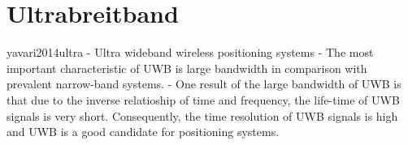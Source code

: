 \begin{comment}
Fragestellung:
- Welche elektrische Beschaltung ist notwendig um das DWM1000 Modul von DecaWave in Betrieb nehmen zu können?
- Wie erfolgt die Entfernungsmessung zwischen den einzelnen UWB--Modulen?
- Wie erfolgt der Datenaustausch zwischen einem UWB--Modul und der Verarbeitungseinheit?
\end{comment}

\chapter{Ultrabreitband}

\begin{comment}
- Was ist UWB überhaupt?
- Wie unterscheidet es sich von der bisherigen Verfahren?
- Auflisten einige Eigenschaften
\end{comment}


yavari2014ultra - Ultra wideband wireless positioning systems
	- The most important characteristic of UWB is large bandwidth in comparison with
prevalent narrow-band systems.
	- One result of the large bandwidth of UWB is that due to the inverse relatioship of
time and frequency, the life-time of UWB signals is very short. Consequently, the
time resolution of UWB signals is high and UWB is a good candidate for positioning
systems.

